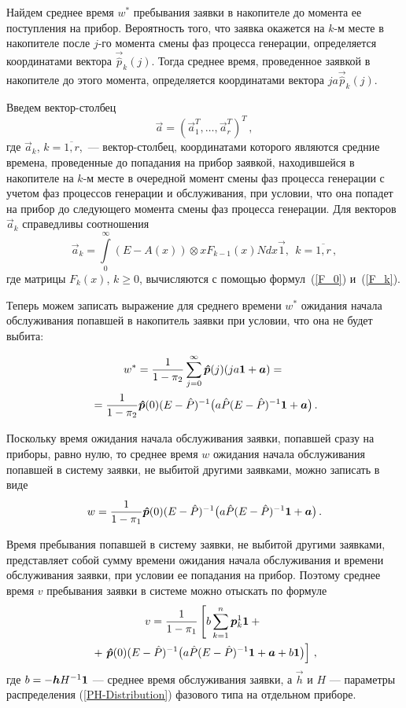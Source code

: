 \begin{multicols}{2}
Найдем среднее время $w^*$ пребывания заявки в накопителе до момента ее поступления на прибор.
Вероятность того, что заявка окажется на $k$-м месте в накопителе
после \mbox{$j$-го} момента смены фаз процесса генерации,
определяется координатами вектора $\vec{\hat p}_k(j)$. Тогда среднее время,
проведенное заявкой в накопителе до этого момента, определяется координатами вектора $ja\vec{\hat p}_k(j)$.

Введем вектор-столбец 
$$
\vec{a}=(\vec{a}_1^T,\ldots,\vec{a}_r^T)^T\,,
$$ 
где
$\vec{a}_k$, $k=\overline{1,r}$,~--- вектор-столбец, координатами которого являются средние времена,
проведенные до попадания на прибор заявкой, находившейся в накопителе на $k$-м месте в очередной момент смены фаз процесса генерации с учетом фаз процессов генерации и обслуживания,
при условии, что она попадет на прибор до следующего момента смены фаз процесса генерации.
Для векторов $\vec{a}_k$ справедливы соотношения
$$
\vec{a}_k=\int\limits_{0}^{\infty} (E-A(x))\otimes xF_{k-1}(x) N dx \vec{1}, \ \ k=\overline{1,r}\,,
$$
где матрицы $F_k(x)$, $k\ge 0$, вычисляются с помощью формул~(\ref{F_0}) и~(\ref{F_k}).

Теперь можем записать выражение для среднего времени $w^*$ ожидания начала обслуживания
попавшей в накопитель заявки при условии, что она не будет выбита:

\noindent
\begin{multline*}
w^*=\fr{1}{1-\pi_2}\sum\limits_{j=0}^{\infty} \vec{\hat p}(j) (ja{\bf 1}+\vec{a})={}\\
{}=
\fr{1}{1-\pi_2}\vec{\hat p}(0)(E-\hat P)^{-1} \bigl( a\hat P(E-\hat P)^{-1}{\bf 1}+ \vec{a}\bigr)\,.
\end{multline*}

Поскольку время ожидания начала обслуживания заявки, попавшей сразу на приборы, равно нулю, то
среднее время $w$ ожидания начала обслуживания попавшей в систему заявки, не выбитой другими заявками,
можно записать в виде
$$
w=\fr{1}{ 1-\pi_1}
\vec{\hat p}(0)(E-\hat P)^{-1} \bigl( a\hat P(E-\hat P)^{-1}{\bf 1}+ \vec{a}\bigr)\,.
$$

Время пребывания попавшей в систему заявки, не выбитой другими заявками,
представляет собой сумму времени ожидания начала обслуживания и времени обслуживания заявки,
при условии ее попадания на прибор. Поэтому среднее время $v$ пребывания заявки в системе
можно отыскать по формуле
\begin{multline*}
v=\fr{1}{ 1-\pi_1}
\left[b\sum\limits_{k=1}^{n} \vec{p}^1_{k}{\bf 1}+{}\right.\\
{}+\left. \vec{\hat p}(0)(E-\hat P)^{-1} \bigl( a\hat P(E-\hat P)^{-1}{\bf 1}+ \vec{a}+ b{\bf 1}\bigr)
\right ]\,,
\end{multline*}
где $b = -\vec{h} H^{-1}{\bf 1}$ --- среднее время обслуживания заявки,
а $\vec{h}$ и $H$ --- параметры распределения (\ref{PH-Distribution}) фазового типа на отдельном приборе.


\end{multicols}
